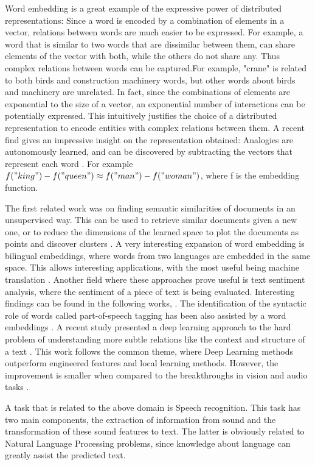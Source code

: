 \documentclass[a4paper]{article}
\begin{document}
		Word embedding is a great example of the expressive power of distributed representations\cite{Collobert 2008}: Since a word is encoded by a combination of elements in a vector, relations between words are much easier to be expressed. For example, a word that is similar to two words that are dissimilar between them, can share elements of the vector with both, while the others do not share any.   Thus complex relations between words can be captured.For example, "crane" is related to both birds and construction machinery words, but other words about birds and machinery are unrelated. In fact, since the combinations of elements are exponential to the size of a vector, an exponential number of interactions can be potentially expressed. This intuitively justifies the choice of a distributed representation to encode entities with complex relations between them.
		A recent find gives an impressive insight on the representation obtained: Analogies are autonomously learned, and can be discovered by subtracting the vectors that represent each word \cite{Mikolov2013}. For example $f("king")-f("queen") \approx f("man")-f("woman") $, where f is the embedding function.
		
		The first related work was on finding semantic similarities of documents in an unsupervised way. This can be used to retrieve similar documents given a new one, or to reduce the dimensions of the learned space to plot the documents as points and discover clusters \cite{Hinton2006,Salakhutdinov2009a}. A very interesting expansion of word embedding is bilingual embeddings, where words from two languages are embedded in the same space. This allows interesting applications, with the most useful being machine translation \cite{Devlin2014}. Another field where these approaches prove useful is text sentiment analysis, where the sentiment of a piece of text is being evaluated. Interesting findings can be found in the following works, \cite{Le2014,Socher2011}. The identification of the syntactic role of words  called part-of-speech tagging has been also assisted by a word embeddings \cite{Santos2014}. A recent study presented a deep learning approach to the hard problem of understanding more subtle relations like the context and structure of a text \cite{Ji2014}. This work follows the common theme, where Deep Learning methods outperform engineered features and local learning methods. However, the improvement is smaller when compared to the breakthroughs in vision and audio tasks \cite{Deng2014}.
		
		A task that is related to the above domain is Speech recognition. This task has two main components, the extraction of information from sound and the transformation of these sound features to text. The latter is obviously related to Natural Language Processing problems, since knowledge about language can greatly assist the predicted text. 
	
\end{document}

